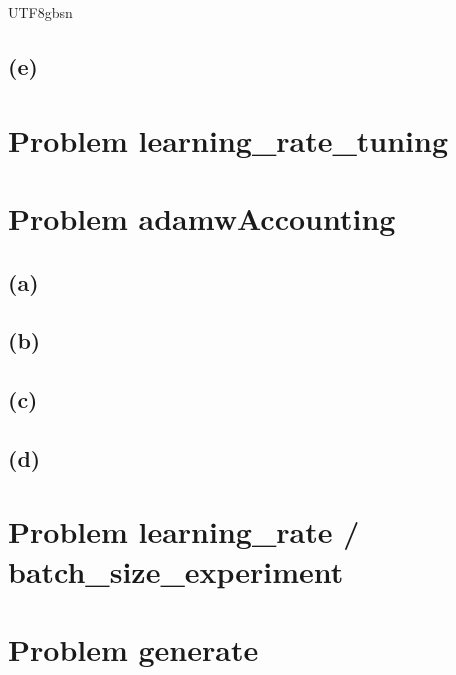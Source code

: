 \documentclass{article}
\begin{document}
\begin{CJK}{UTF8}{gbsn}
\subsection*{(e)}

\section*{Problem learning\_rate\_tuning}

\section*{Problem adamwAccounting}

\subsection*{(a)}

\subsection*{(b)}

\subsection*{(c)}

\subsection*{(d)}

\section*{Problem learning\_rate / batch\_size\_experiment}

\section*{Problem generate}


\end{CJK}
\end{document}
